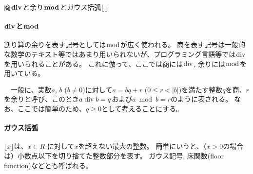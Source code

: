 \vfill
\begin{Column}{商$\boldsymbol{\bDiv}$と余り$\boldsymbol{\bmod}$とガウス括弧$\boldsymbol{\lfloor\,\rfloor}$}
\renewcommand\theequation{c\thechapter.\arabic{equation}}
\setcounter{equation}{0}
\paragraph*{$\boldsymbol\bDiv$と$\boldsymbol\bmod$}
割り算の余りを表す記号としては$\bmod$が広く使われる。
商を表す記号は一般的な数学のテキスト等ではあまり用いられないが、プログラミング言語等では$\bDiv$を用いられることがある。
これに倣って、ここでは商には$\bDiv$, 余りには$\bmod$を用いている。

　一般に、実数$a$, $b$ ($b\neq0$)に対して$a = bq+r$ ($0 \leq r < |b|$)を満たす整数$q$を商、$r$を余りと呼び、このとき$a \bDiv b = q$および$a \bmod b = r$のように表される。
なお、ここでは簡単のため、$q \geq 0$として考えることにする。
\tcbline*
\paragraph*{ガウス括弧}
$\lfloor x\rfloor$は、$x \in R$ に対して$x$を超えない最大の整数。
簡単にいうと、（$x > 0$の場合は）小数点以下を切り捨てた整数部分を表す。
ガウス記号, 床関数(floor function)などとも呼ばれる。
\end{Column}



